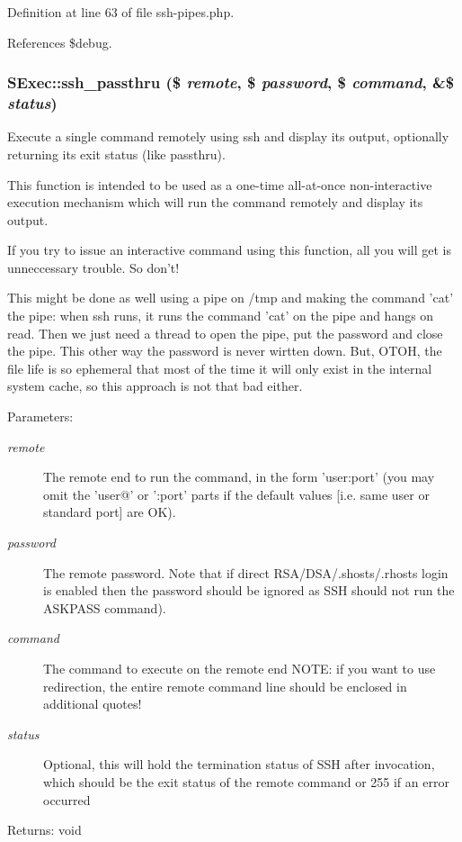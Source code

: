 Definition at line 63 of file ssh-pipes.php.

References \$debug.
\subsubsection{\setlength{\rightskip}{0pt plus 5cm}SExec::ssh\_\-passthru (\$ {\em remote}, \$ {\em password}, \$ {\em command}, \&\$ {\em status})}\label{classSExec_a2}


Execute a single command remotely using ssh and display its output, optionally returning its exit status (like passthru). 

This function is intended to be used as a one-time all-at-once non-interactive execution mechanism which will run the command remotely and display its output.

If you try to issue an interactive command using this function, all you will get is unneccessary trouble. So don't!

This might be done as well using a pipe on /tmp and making the command 'cat' the pipe: when ssh runs, it runs the command 'cat' on the pipe and hangs on read. Then we just need a thread to open the pipe, put the password and close the pipe. This other way the password is never wirtten down. But, OTOH, the file life is so ephemeral that most of the time it will only exist in the internal system cache, so this approach is not that bad either.

\begin{Desc}
\item[Parameters:]
\begin{description}
\item[{\em remote}]The remote end to run the command, in the form 'user:port' (you may omit the 'user@' or ':port' parts if the default values [i.e. same user or standard port] are OK). \item[{\em password}]The remote password. Note that if direct RSA/DSA/.shosts/.rhosts login is enabled then the password should be ignored as SSH should not run the ASKPASS command). \item[{\em command}]The command to execute on the remote end NOTE: if you want to use redirection, the entire remote command line should be enclosed in additional quotes! \item[{\em status}]Optional, this will hold the termination status of SSH after invocation, which should be the exit status of the remote command or 255 if an error occurred \end{description}
\end{Desc}
\begin{Desc}
\item[Returns:]void \end{Desc}


